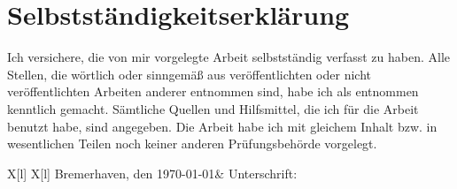 \section*{Selbstständigkeitserklärung}

Ich versichere, die von mir vorgelegte Arbeit selbstständig verfasst zu haben. Alle Stellen, die wörtlich oder sinngemäß aus veröffentlichten oder nicht veröffentlichten Arbeiten anderer entnommen sind, 
habe ich als entnommen kenntlich gemacht. Sämtliche Quellen und Hilfsmittel, die ich für die Arbeit benutzt habe, sind angegeben. Die Arbeit habe ich mit gleichem Inhalt bzw. in wesentlichen 
Teilen noch keiner anderen Prüfungsbehörde vorgelegt.

\vspace*{1cm}

\begin{tblr}{X[l] X[l]}
Bremerhaven, den \today & Unterschrift:\\
\end{tblr}